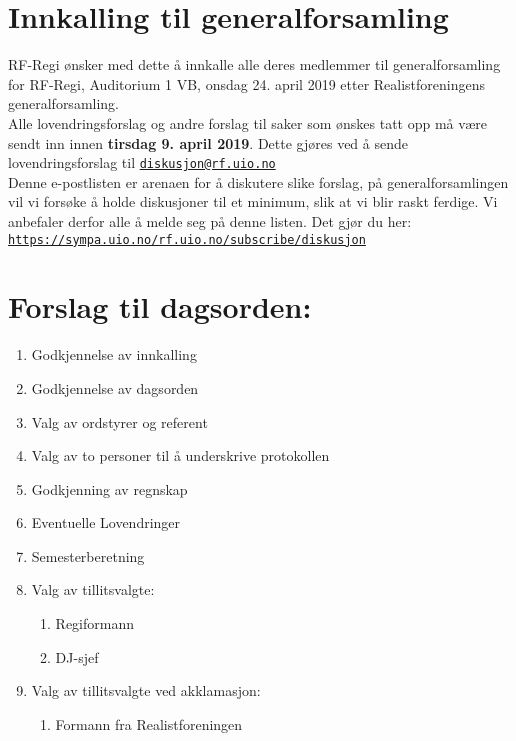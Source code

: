 \documentclass[a4paper]{article}
\begin{document}
\section*{\textsf{\textbf{\huge Innkalling til generalforsamling}}}
\vspace{1cm}

RF-Regi ønsker med dette å innkalle alle deres medlemmer til generalforsamling
for RF-Regi, Auditorium 1 VB, onsdag 24. april 2019 etter
    Realistforeningens generalforsamling. \\

Alle lovendringsforslag og andre forslag til saker som ønskes tatt opp må
være sendt inn innen \textbf{tirsdag 9. april 2019}. Dette gjøres ved å sende
lov\-endringsforslag til
\href{mailto:diskusjon@rf.uio.no}{\texttt{diskusjon@rf.uio.no}} \\

Denne e-postlisten er arenaen for å diskutere slike forslag, på general\-forsamlingen vil vi
forsøke å holde diskusjoner til et minimum, slik at vi blir raskt ferdige.
Vi anbefaler derfor alle å melde seg på denne listen. Det gjør du her:\\
\texttt{\url{https://sympa.uio.no/rf.uio.no/subscribe/diskusjon}}\\

\section*{\textsf{Forslag til dagsorden:}}
\begin{enumerate}
    \item Godkjennelse av innkalling
    \item Godkjennelse av dagsorden
    \item Valg av ordstyrer og referent
    \item Valg av to personer til å underskrive protokollen
    \item Godkjenning av regnskap
    \item Eventuelle Lovendringer
    \item Semesterberetning
    \item Valg av tillitsvalgte:
    \begin{enumerate}
        \item Regiformann
        \item DJ-sjef
    \end{enumerate}
    \item Valg av tillitsvalgte ved akklamasjon:
    \begin{enumerate}
        \item Formann fra Realistforeningen
    \end{enumerate}
\end{enumerate}
\end{document}

